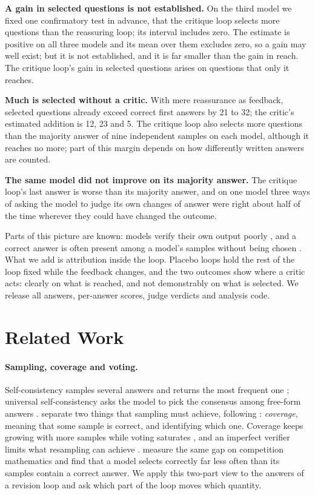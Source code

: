 \documentclass[11pt]{article}
\begin{document}
\textbf{A gain in selected questions is not established.}
On the third model we fixed one confirmatory test in advance, that the critique loop selects more questions than the reassuring loop; its interval includes zero.
The estimate is positive on all three models and its mean over them excludes zero, so a gain may well exist; but it is not established, and it is far smaller than the gain in reach.
The critique loop's gain in selected questions arises on questions that only it reaches.

\textbf{Much is selected without a critic.}
With mere reassurance as feedback, selected questions already exceed correct first answers by 21 to 32; the critic's estimated addition is 12, 23 and 5.
The critique loop also selects more questions than the majority answer of nine independent samples on each model, although it reaches no more; part of this margin depends on how differently written answers are counted.

\textbf{The same model did not improve on its majority answer.}
The critique loop's last answer is worse than its majority answer, and on one model three ways of asking the model to judge its own changes of answer were right about half of the time wherever they could have changed the outcome.

Parts of this picture are known: models verify their own output poorly \citep{huang2024cannot,stechly2024selfverification,song2024mindgap}, and a correct answer is often present among a model's samples without being chosen \citep{brown2024monkeys,jain2026cliff}.
What we add is attribution inside the loop.
Placebo loops hold the rest of the loop fixed while the feedback changes, and the two outcomes show where a critic acts: clearly on what is reached, and not demonstrably on what is selected.
We release all answers, per-answer scores, judge verdicts and analysis code.

\section{Related Work}

\paragraph{Sampling, coverage and voting.}
Self-consistency samples several answers and returns the most frequent one \citep{wang2023selfconsistency,aggarwal2023adaptive}; universal self-consistency asks the model to pick the consensus among free-form answers \citep{chen2023usc}.
\citet{brown2024monkeys} separate two things that sampling must achieve, following \citet{chen2021codex}: \emph{coverage}, meaning that some sample is correct, and identifying which one.
Coverage keeps growing with more samples while voting saturates \citep{chen2024morecalls}, and an imperfect verifier limits what resampling can achieve \citep{stroebl2024flaws}.
\citet{jain2026cliff} measure the same gap on competition mathematics and find that a model selects correctly far less often than its samples contain a correct answer.
We apply this two-part view to the answers of a revision loop and ask which part of the loop moves which quantity.
\end{document}
